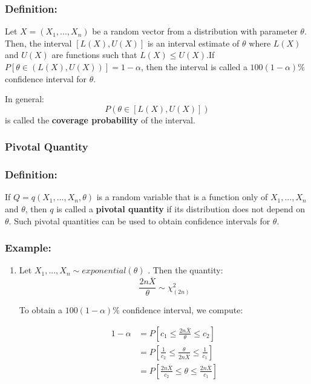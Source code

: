 \documentclass{article}
\begin{document}
\subsubsection*{Definition:}

Let $X = (X_1,...,X_n)$ be a random vector from a distribution with parameter $\theta$. Then, the interval $\left[L(X),U(X)\right]$ is an interval estimate of $\theta$ where $L(X)$ and $U(X)$ are functions such that $L(X) \leq U(X)$.If $P\left[\theta \in \left( L(X),U(X) \right)\right] = 1-\alpha$, then the interval is called a $100(1-\alpha)\%$ confidence interval for $\theta$. 

In general:
\begin{equation*}
    P(\theta \in [L(X),U(X)])
\end{equation*}
is called the \textbf{coverage probability} of the interval.

\subsubsection{Pivotal Quantity}
\subsubsection*{Definition:}

If $Q = q(X_1,...,X_n,\theta)$ is a random variable that is a function only of $X_1,...,X_n$ and $\theta$, then $q$ is called a \textbf{pivotal quantity} if its distribution does not depend on $\theta$. Such pivotal quantities can be used to obtain confidence intervals for $\theta$.

\subsubsection{Example:}
\begin{enumerate}
    \item Let $X_1,...,X_n\sim exponential(\theta)$ . Then the quantity:
    \begin{equation*}
        \frac{2n\overline{X}}{\theta} \sim \chi^2_{(2n)}
    \end{equation*}
    
    To obtain a $100(1-\alpha)\%$ confidence interval, we compute:
    
    \begin{equation*}
        \begin{split}
            1-\alpha &= P\left[ c_1 \leq \frac{2n\overline{X}}{\theta} \leq c_2 \right]\\
            &= P\left[\frac{1}{c_2} \leq \frac{\theta}{2n\overline{X}} \leq \frac{1}{c_1} \right]\\
            &= P\left[ \frac{2n\overline{X}}{c_2} \leq \theta \leq \frac{2n\overline{X}}{c_1} \right]
        \end{split}
    \end{equation*}
\end{enumerate}
\end{document}
